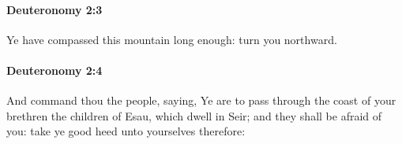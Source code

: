 		\paragraph{Deuteronomy 2:3} %
			\label{DEUTERONOMY-2-3}

			Ye have compassed this mountain long enough: turn you northward.


		\paragraph{Deuteronomy 2:4} %
			\label{DEUTERONOMY-2-4}

			And command thou the people, saying, Ye are to pass through the coast of your brethren the children of Esau, which dwell in Seir; and they shall be afraid of you: take ye good heed unto yourselves therefore:


